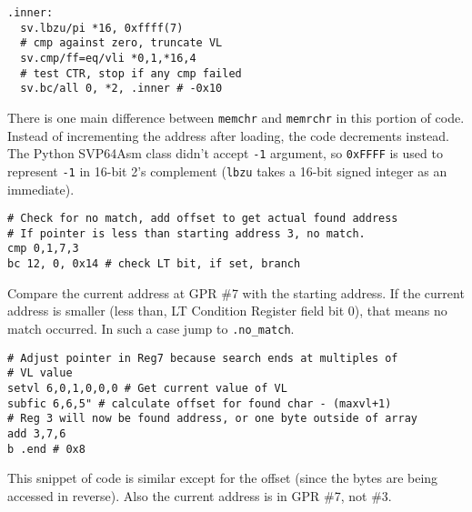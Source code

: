 \begin{verbatim}
.inner:
  sv.lbzu/pi *16, 0xffff(7)
  # cmp against zero, truncate VL
  sv.cmp/ff=eq/vli *0,1,*16,4
  # test CTR, stop if any cmp failed
  sv.bc/all 0, *2, .inner # -0x10
\end{verbatim}
There is one main difference between \texttt{memchr} and \texttt{memrchr} in
this portion of code. Instead of incrementing the address after loading,
the code decrements instead. The Python SVP64Asm class didn't accept
\texttt{-1} argument, so \texttt{0xFFFF} is used to represent \texttt{-1}
in 16-bit 2's complement (\texttt{lbzu} takes a 16-bit signed integer
as an immediate).

\begin{verbatim}
# Check for no match, add offset to get actual found address
# If pointer is less than starting address 3, no match.
cmp 0,1,7,3
bc 12, 0, 0x14 # check LT bit, if set, branch
\end{verbatim}

Compare the current address at \acrshort{GPR} \#7 with the starting address.
If the current address is smaller (less than,
LT Condition Register field bit 0), that means no match occurred.
In such a case jump to \texttt{.no\_match}.

\begin{verbatim}
# Adjust pointer in Reg7 because search ends at multiples of
# VL value
setvl 6,0,1,0,0,0 # Get current value of VL
subfic 6,6,5" # calculate offset for found char - (maxvl+1)
# Reg 3 will now be found address, or one byte outside of array
add 3,7,6
b .end # 0x8
\end{verbatim}
This snippet of code is similar except for the offset (since the bytes are
being accessed in reverse).
Also the current address is in \acrshort{GPR} \#7, not \#3.

